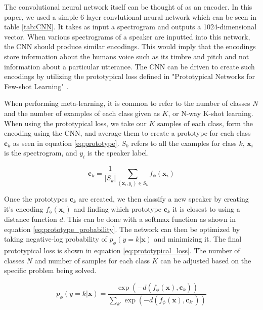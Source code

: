 \documentclass{article}
\begin{document}
The convolutional neural network itself can be thought of as an encoder. In this paper, we used a simple 6 layer 
convlutional neural network which can be seen in table \ref{tab:CNN}. It takes as input a spectrogram and outputs a
1024-dimensional vector. When various spectrograms of a speaker are inputted into this network, the CNN should produce
similar encodings. This would imply that the encodings store information about the humans voice such as its timbre and 
pitch and not information about a particular utterance. The CNN can be driven to create such encodings by utilizing the
prototypical loss defined in "Prototypical Networks for Few-shot Learning" \cite[]{DBLP:journals/corr/SnellSZ17}.

When performing meta-learning, it is common to refer to the number of classes $N$ and the number of examples of each class
given as $K$, or N-way K-shot learning. When using the prototypical loss, we take our $K$ samples of each class, form the
encoding using the CNN, and average them to create a prototype for each class $\mathbf{c}_k$ as seen in equation \ref{eq:prototype}.
$S_k$ refers to all the examples for class $k$, $\mathbf{x}_i$ is the spectrogram, and $y_i$ is the speaker label.

\begin{equation}
  \mathbf{c}_k = \frac{1}{|S_k|} \sum_{\left(\mathbf{x}_i, y_i\right) \in S_k} f_\phi\left(\mathbf{x}_i\right)
  \label{eq:prototype}
\end{equation}

Once the prototypes $\mathbf{c}_k$ are created, we then classify a new speaker by creating it's encoding 
$f_\phi\left(\mathbf{x}_i\right)$ and finding which prototype $\mathbf{c}_k$ it is closest to using a distance function
$d$. This can be done with a softmax function as shown in equation \ref{eq:prototype_probability}. The network can then 
be optimized by taking negative-log probability of $p_\phi\left(y=k | \mathbf{x}\right)$ and minimizing it. The final
prototypical loss is shown in equation \ref{eq:prototypical_loss}. The number of classes $N$ and number of samples for
each class $K$ can be adjusted based on the specific problem being solved.

\begin{equation}
  p_\phi\left(y=k | \mathbf{x}\right) = \frac{\exp\left(-d\left(f_\phi\left(\mathbf{x}\right), \mathbf{c}_k\right)\right)}{\sum_{k'} \exp\left(-d\left(f_\phi\left(\mathbf{x}\right), \mathbf{c}_{k'}\right)\right) }
  \label{eq:prototype_probability}
\end{equation}
\end{document}
